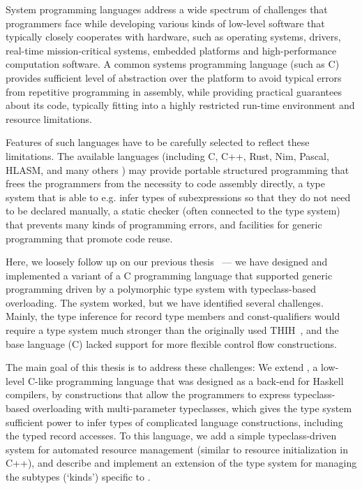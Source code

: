 

System programming languages address a wide spectrum of challenges that programmers face while developing various kinds of low-level software that typically closely cooperates with hardware, such as operating systems, drivers, real-time mission-critical systems, embedded platforms and high-performance computation software.
A common systems programming language (such as C) provides sufficient level of abstraction over the platform to avoid typical errors from repetitive programming in assembly, while providing practical guarantees about its code, typically fitting into a highly restricted run-time environment and resource limitations.

Features of such languages have to be carefully selected to reflect these limitations.
The available languages (including C, C++, Rust, Nim, Pascal, HLASM, and many others ) may provide portable structured programming that frees the programmers from the necessity to code assembly directly, a type system that is able to e.g. infer types of subexpressions so that they do not need to be declared manually, a static checker (often connected to the type system) that prevents many kinds of programming errors, and facilities for generic programming that promote code reuse.

Here, we loosely follow up on our previous thesis~\cite{klepl2020type} --- we have designed and implemented a variant of a C programming language that supported generic programming driven by a polymorphic type system with typeclass-based overloading.
The system worked, but we have identified several challenges.
Mainly, the type inference for record type members and const-qualifiers would require a type system much stronger than the originally used THIH~\cite{jones1999typing}, and the base language (C) lacked support for more flexible control flow constructions.

The main goal of this thesis is to address these challenges: We extend \cmm, a low-level C-like programming language that was designed as a back-end for Haskell compilers, by constructions that allow the programmers to express typeclass-based overloading with multi-parameter typeclasses, which gives the type system sufficient power to infer types of complicated language constructions, including the typed record accesses. To this language, we add a simple typeclass-driven system for automated resource management (similar to resource initialization in C++), and describe and implement an extension of the type system for managing the subtypes (`kinds') specific to \cmm.

